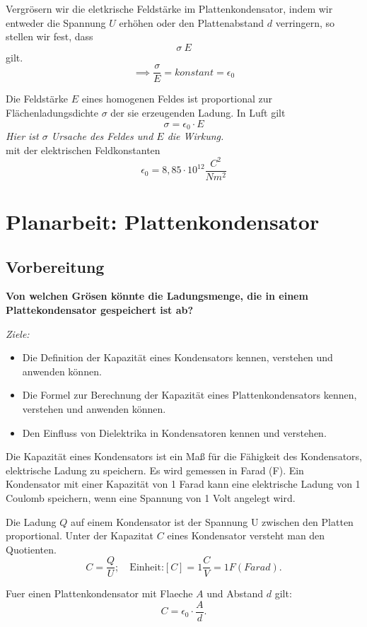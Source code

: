 \documentclass{report}
\begin{document}
Vergr\"osern wir die eletkrische Feldst\"arke im Plattenkondensator, indem wir
entweder die Spannung $U$ erh\"ohen oder den Plattenabstand $d$ verringern, so
stellen wir fest, dass \[\sigma ~ E\] gilt. \[\implies \frac{\sigma}{E}=konstant=\epsilon_0\]

\begin{tcolorbox}[colback=red!10!white,colframe=red!75!black]
Die Feldst\"arke $E$ eines homogenen Feldes ist proportional zur
Fl\"achenladungsdichte $\sigma$ der sie erzeugenden Ladung. In Luft gilt
\[\sigma = \epsilon_0 \cdot E\] \textit{Hier ist $\sigma$ Ursache des Feldes und $E$ die Wirkung.}\\
mit der elektrischen Feldkonstanten \[\epsilon_0 = 8,85 \cdot 10^{12} \frac{C^2}{Nm^2}\]
\end{tcolorbox}


\section{Planarbeit: Plattenkondensator}
\subsection{Vorbereitung}
\textbf{Von welchen Gr\"osen k\"onnte die Ladungsmenge, die in einem
Plattekondensator gespeichert ist ab?}

\textit{Ziele: }
\begin{itemize}
  \item Die Definition der Kapazität eines Kondensators kennen, verstehen und anwenden können.
  \item Die Formel zur Berechnung der Kapazität eines Plattenkondensators kennen, verstehen und anwenden können.
  \item Den Einfluss von Dielektrika in Kondensatoren kennen und verstehen.
\end{itemize}

Die Kapazität eines Kondensators ist ein Maß für die Fähigkeit des
Kondensators, elektrische Ladung zu speichern. Es wird gemessen in Farad (F).
Ein Kondensator mit einer Kapazität von 1 Farad kann eine elektrische Ladung
von 1 Coulomb speichern, wenn eine Spannung von 1 Volt angelegt wird.


Die Ladung $Q$ auf einem Kondensator ist der Spannung U zwischen den Platten
proportional. Unter der Kapazitat $C$ eines Kondensator versteht man den
Quotienten.
\[C=\frac{Q}{U}; \quad \text{Einheit:} [C]=1 \frac{C}{V} = 1F (Farad).\]

Fuer einen Plattenkondensator mit Flaeche $A$ und Abstand $d$ gilt: 
\[C=\epsilon_0 \cdot \frac{A}{d}.\]
\end{document}
